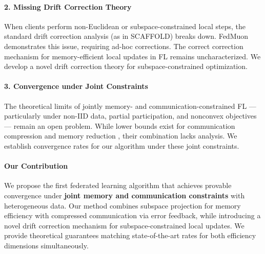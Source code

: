 \paragraph{2. Missing Drift Correction Theory}
When clients perform non-Euclidean or subspace-constrained local steps, the standard drift correction analysis (as in SCAFFOLD) breaks down. FedMuon \cite{liu2025fedmuon} demonstrates this issue, requiring ad-hoc corrections. The correct correction mechanism for memory-efficient local updates in FL remains uncharacterized. We develop a novel drift correction theory for subspace-constrained optimization.

\paragraph{3. Convergence under Joint Constraints}
The theoretical limits of jointly memory- and communication-constrained FL — particularly under non-IID data, partial participation, and nonconvex objectives — remain an open problem. While lower bounds exist for communication compression \cite{he2023lowerbounds} and memory reduction \cite{zhao2024galore}, their combination lacks analysis. We establish convergence rates for our algorithm under these joint constraints.

\paragraph{Our Contribution}
We propose the first federated learning algorithm that achieves provable convergence under \textbf{joint memory and communication constraints} with heterogeneous data. Our method combines subspace projection for memory efficiency with compressed communication via error feedback, while introducing a novel drift correction mechanism for subspace-constrained local updates. We provide theoretical guarantees matching state-of-the-art rates for both efficiency dimensions simultaneously.